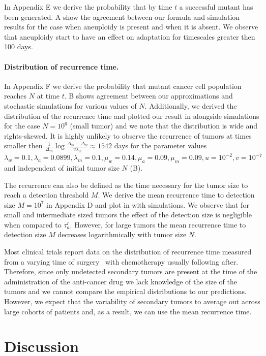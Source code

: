 \documentclass[12pt]{extarticle}
\begin{document}
In Appendix E we derive the probability that by time $t$ a successful mutant has been generated. A show the agreement between our formula and simulation results for the case when aneuploidy is present and when it is absent.  We observe that aneuploidy start to have an effect on adaptation for timescales greater then 100 days. %

\paragraph{Distribution of  recurrence time.}
In Appendix F we derive the probability that mutant cancer cell population reaches $N$ at time $t$. B shows agreement between our approximations and stochastic simulations for various values of $N$. Additionally, we derived the distribution of the recurrence time and plotted our result in  alongside simulations for the case $N=10^6$ (small tumor) and we note that the distribution is wide and rights-skewed. It is highly unlikely to observe the recurrence of tumors at times smaller then $\frac{1}{\Delta_m}\log\frac{\Delta_m-\Delta_w}{v\lambda_w}\approx1542$ days for the parameter values $\lambda_w=0.1, \lambda_a=0.0899,\lambda_m=0.1,\mu_w=0.14,\mu_a=0.09,\mu_m=0.09, u=10^{-2}, v=10^{-7}$ and independent of initial tumor size $N$ (B). 

The recurrence can also be defined as the time necessary for the tumor size to reach a detection threshold $M$. We derive the mean recurrence time to detection size $M=10^7$ in Appendix D and plot in  with simulations. We observe that  for small and intermediate sized tumors the effect of the detection size is negligible when compared to $\tau_a^r$. However, for large tumors the mean recurrence time to detection size $M$ decreases logarithmically with tumor size $N$.

Most clinical trials report data on the distribution of recurrence time measured from a varying time of surgery~\citep{avanzini2019cancer} with chemotherapy usually following after. Therefore, since only undetected secondary tumors are present at the time of the administration of the anti-cancer drug we lack knowledge of the size of the tumors and we cannot compare the empirical distributions to our predictions. However, we expect that the variability of secondary tumors to average out across large cohorts of patients and, as a result, we can use the mean recurrence time. 
\section*{Discussion}
\end{document}

